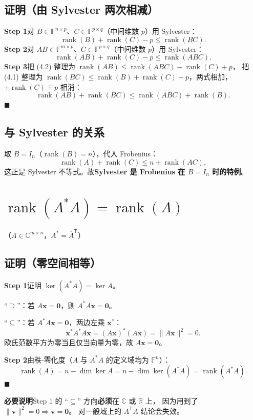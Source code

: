 \documentclass[11pt]{ctexart}
\newcommand{\rank}{\operatorname{rank}}
\newcommand{\F}{\mathbb{F}}
\newcommand{\C}{\mathbb{C}}
\newcommand{\R}{\mathbb{R}}
\newcommand{\T}{^{\mathsf T}}
\begin{document}
\subsection{证明（由 Sylvester 两次相减）}
\textbf{Step 1}\quad 对 $B\in\F^{n\times p}$、$C\in\F^{p\times q}$（中间维数 $p$）用 Sylvester：
\[
\rank(B)+\rank(C)-p\le\rank(BC). \tag{4.1}
\]
\textbf{Step 2}\quad 对 $AB\in\F^{m\times p}$、$C\in\F^{p\times q}$（中间维数 $p$）用 Sylvester：
\[
\rank(AB)+\rank(C)-p\le\rank(ABC). \tag{4.2}
\]
\textbf{Step 3}\quad 把 (4.2) 整理为 $\rank(AB)\le\rank(ABC)-\rank(C)+p$，
把 (4.1) 整理为 $\rank(BC)\le\rank(B)+\rank(C)-p$，两式相加，$\pm\rank(C)\mp p$ 相消：
\[
\rank(AB)+\rank(BC)\le\rank(ABC)+\rank(B).
\]
\hfill$\blacksquare$

\subsection{与 Sylvester 的关系}
取 $B=I_n$（$\rank(B)=n$），代入 Frobenius：
\[
\rank(A)+\rank(C)\le n+\rank(AC),
\]
这正是 Sylvester 不等式。故\textbf{Sylvester 是 Frobenius 在 $B=I_n$ 时的特例}。

\section{$\rank(A^{*}A)=\rank(A)$}
（$A\in\C^{m\times n}$，$A^{*}=\overline{A}\T$）

\subsection{证明（零空间相等）}
\textbf{Step 1}\quad 证明 $\ker(A^{*}A)=\ker A$。

``$\supseteq$''：若 $A\mathbf x=\mathbf 0$，则 $A^{*}A\mathbf x=\mathbf 0$。

``$\subseteq$''：若 $A^{*}A\mathbf x=\mathbf 0$，两边左乘 $\mathbf x^{*}$：
\[
\mathbf x^{*}A^{*}A\mathbf x=(A\mathbf x)^{*}(A\mathbf x)=\lVert A\mathbf x\rVert^2=0 .
\]
欧氏范数平方为零当且仅当向量为零，故 $A\mathbf x=\mathbf 0$。

\textbf{Step 2}\quad 由秩-零化度（$A$ 与 $A^{*}A$ 的定义域均为 $\F^n$）：
\[
\rank(A)=n-\dim\ker A=n-\dim\ker(A^{*}A)=\rank(A^{*}A).
\]
\hfill$\blacksquare$

\begin{warnbox}
\textbf{必要说明}\quad Step 1 的 ``$\subseteq$'' 方向\textbf{必须}在 $\C$ 或 $\R$ 上，
因为用到了 $\lVert\mathbf v\rVert^2=0\Rightarrow\mathbf v=\mathbf 0$。
对一般域上的 $A\T A$ 结论会失效。
\end{warnbox}
\end{document}
